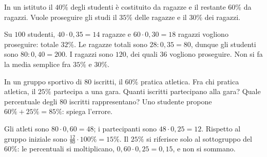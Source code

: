 \begin{esercizi}
\begin{esercizio}
\question In un istituto il $40\%$ degli studenti è costituito da ragazze e il restante $60\%$ da ragazzi. Vuole proseguire gli studi il $35\%$ delle ragazze e il $30\%$ dei ragazzi.
\begin{solution}
Su $100$ studenti, $40\cdot0{,}35=14$ ragazze e $60\cdot0{,}30=18$ ragazzi vogliono proseguire: totale $\boxed{32\%}$. Le ragazze totali sono $28:0{,}35=80$, dunque gli studenti sono $80:0{,}40=\boxed{200}$. I ragazzi sono $120$, dei quali $\boxed{36}$ vogliono proseguire. Non si fa la media semplice fra $35\%$ e $30\%$.
\end{solution}
\end{esercizio}

\begin{esercizio}
\question In un gruppo sportivo di $80$ iscritti, il $60\%$ pratica atletica. Fra chi pratica atletica, il $25\%$ partecipa a una gara. Quanti iscritti partecipano alla gara? Quale percentuale degli $80$ iscritti rappresentano? Uno studente propone $60\%+25\%=85\%$: spiega l'errore.
\begin{solution}
Gli atleti sono $80\cdot0{,}60=48$; i partecipanti sono $48\cdot0{,}25=\boxed{12}$. Rispetto al gruppo iniziale sono $\frac{12}{80}\cdot100\%=\boxed{15\%}$. Il $25\%$ si riferisce solo al sottogruppo del $60\%$: le percentuali si moltiplicano, $0{,}60\cdot0{,}25=0{,}15$, e non si sommano.
\end{solution}
\end{esercizio}
\end{esercizi}
\finefila










